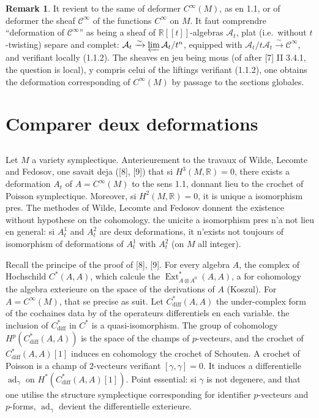\documentclass[11pt,a4paper]{article}
\theoremstyle{plain}
\theoremstyle{definition}
\newtheorem{remark}[theorem]{Remark}
\DeclareMathOperator{\Ext}{Ext}
\DeclareMathOperator{\ad}{ad}
\newcommand{\R}{\mathbb{R}}
\newcommand{\iso}{\xrightarrow{\sim}}
\begin{document}
\begin{remark}
It revient to the same of deformer $C^{\infty}(M)$, as en 1.1, or of
deformer the sheaf $\mathcal{C}^{\infty}$ of the functions $C^{\infty}$ on $M$. It faut comprendre ``deformation
of $\mathcal{C}^{\infty}$'' as being a sheaf of $\R[[t]]$-algebras $\mathcal{A}_{t}$, plat (i.e.\ without $t$-twisting)
separe and complet: $\mathcal{A}_{t} \iso \varprojlim \mathcal{A}_{t}/t^{n}$, equipped with $\mathcal{A}_{t}/t\mathcal{A}_{t} \iso \mathcal{C}^{\infty}$, and verifiant
locally (1.1.2). The sheaves en jeu being mous (of after [7] II 3.4.1, the question
is local), y compris celui of the liftings verifiant (1.1.2), one obtains the
deformation corresponding of $C^{\infty}(M)$ by passage to the sections globales.
\end{remark}

\section{Comparer deux deformations}

\subsection{}
Let $M$ a variety symplectique. Anterieurement to the travaux of Wilde,
Lecomte and Fedosov, one savait deja ([8], [9]) that si $H^{3}(M,\R) = 0$, there exists a
deformation $A_{t}$ of $A = C^{\infty}(M)$ to the sens 1.1, donnant lieu to the crochet of Poisson symplectique. Moreover, si $H^{2}(M, \R) = 0$, it is unique a isomorphism pres. The methodes of Wilde, Lecomte and Fedosov donnent the existence without hypothese on the cohomology. the unicite a isomorphism pres n'a not lieu en general: si $A_{t}^{1}$ and $A_{t}^{2}$ are deux deformations, it n'exists not toujours of isomorphism of deformations of $A_{t}^{1}$ with $A_{t}^{2}$ (on $M$ all integer).

Recall the principe of the proof of [8], [9]. For every algebra $A$, the complex of Hochschild $C^{*}(A,A)$, which calcule the $\Ext^{*}_{A \otimes A^{0}}(A,A)$, a for cohomology the algebra exterieure on the space of the derivations of $A$ (Koszul). For $A = C^{\infty}(M)$, that se precise as suit. Let $C^{*}_{\text{diff}}(A,A)$ the under-complex form of the cochaines data by of the operateurs differentiels en each variable. the inclusion of $C^{*}_{\text{diff}}$ in $C^{*}$ is a quasi-isomorphism. The group of cohomology $H^{p}(C^{*}_{\text{diff}}(A,A))$ is the space of the champs of $p$-vecteurs, and the crochet of $C^{*}_{\text{diff}}(A,A)[1]$ induces en cohomology the crochet of Schouten. A crochet of Poisson is a champ of $2$-vecteurs verifiant $[\gamma,\gamma] = 0$. It induces a differentielle $\ad_{\gamma}$ on $H^{*}(C^{*}_{\text{diff}}(A,A)[1])$. Point essential: si $\gamma$ is not degenere, and that one utilise the structure symplectique corresponding for identifier $p$-vecteurs and $p$-forms, $\ad_{\gamma}$ devient the differentielle exterieure.
\end{document}
